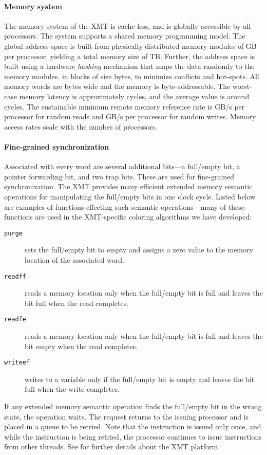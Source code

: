 \documentclass{article}
\begin{document}
\paragraph{Memory system}
The memory system of the  XMT is cache-less, and is globally accessible by all processors.
The system supports a shared memory programming model.
The global address space is built from physically distributed memory modules of  GB per processor, yielding a total memory size of  TB.
Further, the address space is built using a hardware {\em hashing} mechanism 
that maps the data randomly to the memory modules,  
in blocks of size  bytes,  to  minimize conflicts and hot-spots. 
All memory words are  bytes wide and the memory is byte-addressable.
The worst-case memory latency is approximately  cycles, and the average 
value is around  cycles.  
The sustainable minimum remote memory reference rate is  GB/s 
per processor for random reads and  GB/s per processor for random writes.  
Memory access rates scale with the number of processors.

\paragraph{Fine-grained synchronization}
Associated with every word are several additional bits---a full/empty bit, a pointer forwarding bit,
and two trap bits. These are used for fine-grained  synchronization.
The XMT provides many efficient extended memory semantic operations for manipulating 
the full/empty bits in one clock cycle.
Listed below are examples of functions effecting such semantic operations---many of 
these functions are used in the XMT-specific coloring algorithms we have developed:
\begin{description}
\item[\texttt{purge}] sets the full/empty bit to empty and assigns a zero value 
to the memory location of the associated word. 
\item[\texttt{readff}] reads a memory location only when the full/empty bit is full and leaves the
bit full when the read completes.
\item[\texttt{readfe}] reads a memory location only when the full/empty bit is full and leaves
the bit empty when the read completes.
\item[\texttt{writeef}] writes to a variable only if the full/empty bit is empty and leaves
the bit full when the write completes.
\end{description}
If any extended memory semantic operation finds the full/empty bit in the wrong state, 
the operation waits.
The request returns to the issuing processor and is placed in a queue to be retried.
Note that the instruction is issued only once, and while the instruction is being retried, the processor continues to issue instructions from other threads.
See \cite{John1,Nieplocha07} for further details about the XMT platform.
\end{document}
